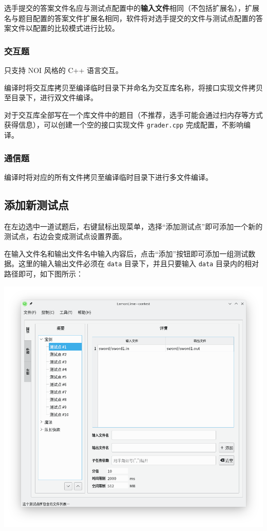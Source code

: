 \documentclass[UTF-8]{ctexart}
\begin{document}
				选手提交的答案文件名应与测试点配置中的\textbf{输入文件}相同（不包括扩展名），扩展名与题目配置的答案文件扩展名相同，软件将对选手提交的文件与测试点配置的答案文件以配置的比较模式进行比较。

			\subsubsection{交互题}

				只支持 NOI 风格的 C++ 语言交互。

				编译时将交互库拷贝至编译临时目录下并命名为交互库名称，将接口实现文件拷贝至目录下，进行双文件编译。

				对于交互库全部写在一个库文件中的题目（不推荐，选手可能会通过扫内存等方式获得信息），可以创建一个空的接口实现文件 \texttt{grader.cpp} 完成配置，不影响编译。

			\subsubsection{通信题}

				编译时将对应的所有文件拷贝至编译临时目录下进行多文件编译。

		\subsection{添加新测试点}

			在左边选中一道试题后，右键鼠标出现菜单，选择“添加测试点”即可添加一个新的测试点，右边会变成测试点设置界面。

			在输入文件名和输出文件名中输入内容后，点击“添加”按钮即可添加一组测试数据。这里的输入输出文件必须在 \texttt{data} 目录下，并且只要输入 \texttt{data} 目录内的相对路径即可，如下图所示：

			\begin{center}
			\includegraphics[scale=0.5]{pics/edittestcase.png}
			\end{center}
\end{document}
